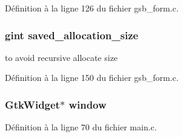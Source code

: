 Définition à la ligne 126 du fichier gsb\_\-form.c.

\subsubsection[{saved\_\-allocation\_\-size}]{\setlength{\rightskip}{0pt plus 5cm}gint {\bf saved\_\-allocation\_\-size}}\label{gsb__form__config_8c_ae4729003de616a56e4a3f22732d2061f}
to avoid recursive allocate size 

Définition à la ligne 150 du fichier gsb\_\-form.c.

\subsubsection[{window}]{\setlength{\rightskip}{0pt plus 5cm}GtkWidget$\ast$ {\bf window}}\label{gsb__form__config_8c_a3d346c08cf2d67c388caabffb412b293}


Définition à la ligne 70 du fichier main.c.

